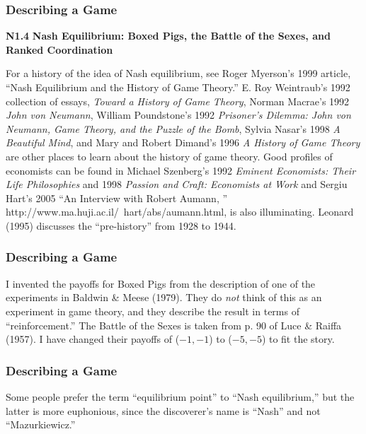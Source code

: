  \begin{frame}[fragile]\frametitle{Describing a Game}




 {\bf N1.4 } {\bf Nash Equilibrium: {Boxed Pigs},   the {Battle  of the
Sexes}, and  { Ranked Coordination }    }

 For a history of  the idea of Nash equilibrium, see Roger Myerson's
1999 article,  ``Nash Equilibrium and the History of Game Theory.''  E. Roy
Weintraub's 1992 collection of essays, {\it Toward a History of Game Theory},
Norman Macrae's 1992 {\it John von Neumann},
William Poundstone's 1992
  {\it Prisoner's Dilemma: John von Neumann, Game Theory, and the Puzzle of the
Bomb}, Sylvia Nasar's 1998  {\it A Beautiful Mind}, and Mary and Robert Dimand's
1996  {\it     A History of Game Theory}  are other places to learn about the
history of game theory. Good profiles of economists can be found in Michael
Szenberg's 1992  {\it Eminent Economists: Their Life
Philosophies}   
and 1998   {\it Passion and Craft: Economists at Work}  and   Sergiu Hart's
2005  ``An Interview with Robert Aumann,
'' http://www.ma.huji.ac.il/~hart/abs/aumann.html, is also illuminating.
Leonard (1995) discusses the ``pre-history'' from   1928
to 1944.

\end{frame}
 \begin{frame}[fragile]\frametitle{Describing a Game}
 
 I invented the payoffs for {Boxed Pigs}   from the description of one of
the experiments in Baldwin \& Meese (1979). They do {\it not} think of this as
an experiment in game theory, and they describe the result in terms of
``reinforcement.'' {The  Battle of the Sexes} is taken from p. 90 of Luce \&
Raiffa (1957). I have changed their payoffs of ($-1,-1$) to ($-5,-5$) to fit the
story.

\end{frame}
 \begin{frame}[fragile]\frametitle{Describing a Game}
 Some people prefer the term  ``equilibrium point'' to ``Nash
equilibrium,'' but the latter is more euphonious, since the  discoverer's name
is ``Nash'' and not ``Mazurkiewicz.''

\end{frame}
